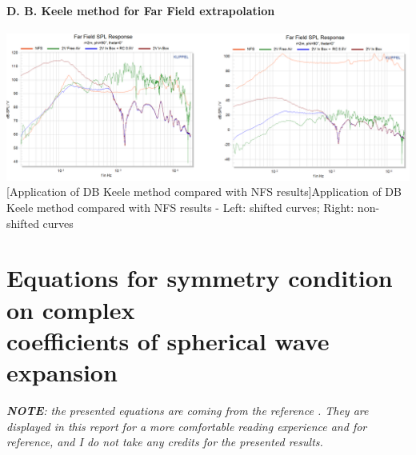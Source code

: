 \documentclass{report}
\begin{document}
\begin{appendices}
\subsubsection{D. B. Keele method for Far Field extrapolation}
\label{Curves:dbkFF}

\begin{center}
	\includegraphics[width=\textwidth]{Appendix/DKeele_FF_All} 
    \captionsetup{hypcap=false} 
	[Application of DB Keele method compared with NFS results]{Application of DB Keele method compared with NFS results - Left: shifted curves; Right: non-shifted curves} 
	\label{fig:dbk_fig}
\end{center}



\chapter[Equations for symmetry condition on complex coefficients of spherical wave expansion]{Equations for symmetry condition on complex \\ coefficients of spherical wave expansion}
\label{chap:sym}

\textit{\textbf{NOTE}: the presented equations are coming from the reference \cite{aeshs}. They are displayed in this report for a more comfortable reading experience and for reference, and I do not take any credits for the presented results.} \\


\end{appendices}
\end{document}

